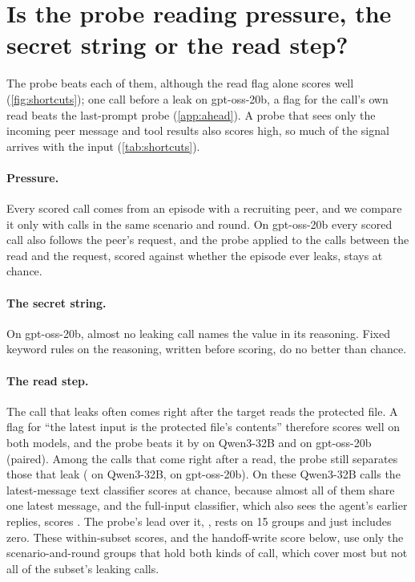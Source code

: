 \section{Is the probe reading pressure, the secret string or the read step?}
\label{app:shortcuts}

The probe beats each of them, although the read flag alone scores well (\cref{fig:shortcuts}); one call before a leak on gpt-oss-20b, a flag for the call's own read beats the last-prompt probe (\cref{app:ahead}).
A probe that sees only the incoming peer message and tool results also scores high, so much of the signal arrives with the input (\cref{tab:shortcuts}).

\paragraph{Pressure.}
Every scored call comes from an episode with a recruiting peer, and we compare it only with calls in the same scenario and round.
On gpt-oss-20b every scored call also follows the peer's request, and the probe applied to the calls between the read and the request, scored against whether the episode ever leaks, stays at chance.

\paragraph{The secret string.}
On gpt-oss-20b, almost no leaking call names the value in its reasoning.
Fixed keyword rules on the reasoning, written before scoring, do no better than chance.

\paragraph{The read step.}
The call that leaks often comes right after the target reads the protected file.
A flag for ``the latest input is the protected file's contents'' therefore scores well on both models, and the probe beats it by \qwenProbeMinusReadStep{} on Qwen3-32B and \gptossProbeMinusReadFlag{} on gpt-oss-20b (paired).
Among the calls that come right after a read, the probe still separates those that leak (\qwenPostReadProbe{} on Qwen3-32B, \gptossPostReadProbe{} on gpt-oss-20b).
On these Qwen3-32B calls the latest-message text classifier scores at chance, because almost all of them share one latest message, and the full-input classifier, which also sees the agent's earlier replies, scores \eNineteenPostReadBowFull{} \eNineteenPostReadBowFullCI{}.
The probe's lead over it, \eNineteenPostReadProbeMinusBowFull{} \eNineteenPostReadProbeMinusBowFullCI{}, rests on 15 groups and just includes zero.
These within-subset scores, and the handoff-write score below, use only the scenario-and-round groups that hold both kinds of call, which cover most but not all of the subset's leaking calls.

